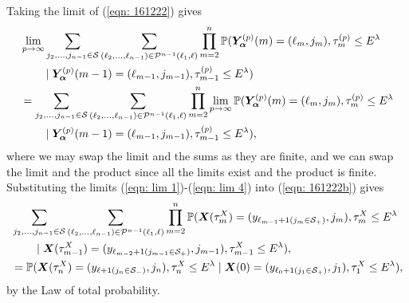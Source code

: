 Taking the limit of (\ref{eqn: 161222}) gives 
\begin{align}
	&\lim_{p\to\infty}\sum_{j_2,\dots,j_{n-1}\in\mathcal S}\sum_{(\ell_2,\dots,\ell_{n-1}) \in\mathcal P^{n-1}(\ell_1,\ell)}\prod_{m=2}^{n}\mathbb P(\bm{Y}_{\bm{\alpha}}^{(p)}(m) = (\ell_m, j_m), \tau_{m}^{(p)}\leq E^\lambda \nonumber
            	 \\&\qquad\mid \bm{Y}_{\bm{\alpha}}^{(p)}(m-1) = (\ell_{m-1}, j_{m-1}), \tau_{m-1}^{(p)}\leq E^\lambda) \nonumber 
	\\ &=\sum_{j_2,\dots,j_{n-1}\in\mathcal S}\sum_{(\ell_2,\dots,\ell_{n-1}) \in\mathcal P^{n-1}(\ell_1,\ell)}\prod_{m=2}^{n}\lim_{p\to\infty} \mathbb P(\bm{Y}_{\bm{\alpha}}^{(p)}(m) = (\ell_m, j_m), \tau_{m}^{(p)}\leq E^\lambda \nonumber
            	 \\&\qquad \mid \bm{Y}_{\bm{\alpha}}^{(p)}(m-1) = (\ell_{m-1}, 
	 	 j_{m-1}), \tau_{m-1}^{(p)}\leq E^\lambda),
	 \label{eqn: 161222b}
\end{align}
where we may swap the limit and the sums as they are finite, and we can swap the limit and the product since all the limits exist and the product is finite. Substituting the limits (\ref{eqn: lim 1})-(\ref{eqn: lim 4}) into (\ref{eqn: 161222b}) gives 
\begin{align}
	&\sum_{j_2,\dots,j_{n-1}\in\mathcal S}\sum_{(\ell_2,\dots,\ell_{n-1})  \in\mathcal P^{n-1}(\ell_1,\ell)} \prod_{m=2}^{n}\mathbb P(\boldsymbol X(\tau_m^X) = (y_{\ell_{m-1}+1(j_{m}\in\mathcal S_+)}, j_m), \tau_{m}^X\leq E^\lambda \nonumber
            	\\&\qquad \mid \boldsymbol X(\tau_{m-1}^X)=(y_{\ell_{m-2}+1(j_{m-1}\in\mathcal S_+)},j_{m-1}),\tau_{m-1}^X\leq E^\lambda),\nonumber
		\\&= \mathbb P(\boldsymbol X(\tau_n^X) = (y_{\ell+1(j_{n}\in\mathcal S_-)}, 
		j_n), \tau_{n}^X\leq E^\lambda \mid \boldsymbol X(0)=(y_{\ell_{0}+1(j_{1}\in\mathcal S_+)},
		j_{1}), 
		\tau_1^X\leq E^\lambda),
\end{align}
by the Law of total probability.

